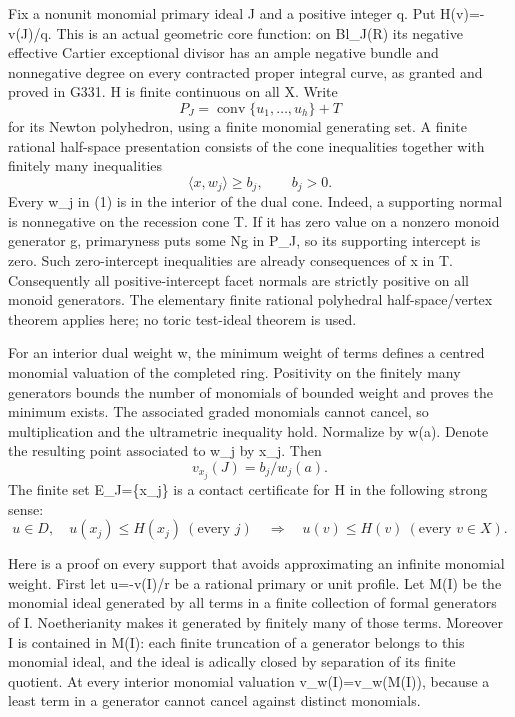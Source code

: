 \documentclass[11pt]{article}
\begin{document}
Fix a nonunit monomial primary ideal J and a positive integer q. Put H(v)=-v(J)/q. This is an actual geometric core function: on Bl\_J(R) its negative effective Cartier exceptional divisor has an ample negative bundle and nonnegative degree on every contracted proper integral curve, as granted and proved in G331. H is finite continuous on all X. Write
\[
 P_J=\operatorname{conv}\{u_1,\ldots,u_h\}+T
\]
for its Newton polyhedron, using a finite monomial generating set. A finite rational half-space presentation consists of the cone inequalities together with finitely many inequalities
\[
 \langle x,w_j\rangle\ge b_j,\qquad b_j>0.                 \tag{1}
\]
Every w\_j in (1) is in the interior of the dual cone. Indeed, a supporting normal is nonnegative on the recession cone T. If it has zero value on a nonzero monoid generator g, primaryness puts some Ng in P\_J, so its supporting intercept is zero. Such zero-intercept inequalities are already consequences of x in T. Consequently all positive-intercept facet normals are strictly positive on all monoid generators. The elementary finite rational polyhedral half-space/vertex theorem applies here; no toric test-ideal theorem is used.

For an interior dual weight w, the minimum weight of terms defines a centred monomial valuation of the completed ring. Positivity on the finitely many generators bounds the number of monomials of bounded weight and proves the minimum exists. The associated graded monomials cannot cancel, so multiplication and the ultrametric inequality hold. Normalize by w(a). Denote the resulting point associated to w\_j by x\_j. Then
\[
 v_{x_j}(J)=b_j/w_j(a).
\]
The finite set E\_J=\{x\_j\} is a contact certificate for H in the following strong sense:
\[
 u\in D,\quad u(x_j)\le H(x_j)\ (\text{every }j)
 \quad\Longrightarrow\quad u(v)\le H(v)\ (\text{every }v\in X).       \tag{2}
\]

Here is a proof on every support that avoids approximating an infinite monomial weight. First let u=-v(I)/r be a rational primary or unit profile. Let M(I) be the monomial ideal generated by all terms in a finite collection of formal generators of I. Noetherianity makes it generated by finitely many of those terms. Moreover I is contained in M(I): each finite truncation of a generator belongs to this monomial ideal, and the ideal is adically closed by separation of its finite quotient. At every interior monomial valuation v\_w(I)=v\_w(M(I)), because a least term in a generator cannot cancel against distinct monomials.
\end{document}
